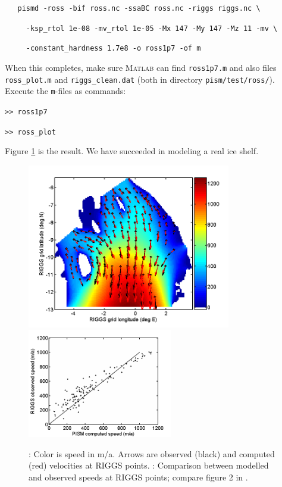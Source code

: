 \documentclass[11pt,final]{amsart}
\newcommand{\Matlab}{\textsc{Matlab}\xspace}
\begin{document}
\verb|   pismd -ross -bif ross.nc -ssaBC ross.nc -riggs riggs.nc \|

\verb|     -ksp_rtol 1e-08 -mv_rtol 1e-05 -Mx 147 -My 147 -Mz 11 -mv \|

\verb|     -constant_hardness 1.7e8 -o ross1p7 -of m|

\noindent When this completes, make sure \Matlab can find \verb|ross1p7.m| and also files \verb|ross_plot.m| and \verb|riggs_clean.dat| (both in directory \verb|pism/test/ross/|).  Execute the \verb|m|-files as commands:

\verb|>> ross1p7|

\verb|>> ross_plot|

\noindent Figure \ref{fig:rossmatlab} is the result.  We have succeeded in modeling a real ice shelf.

\begin{figure}[ht]
\includegraphics[width=3.5in,keepaspectratio=true]{figs/rossquiver}\quad \includegraphics[width=2.5in,keepaspectratio=true]{figs/rossscatter}
\caption{: Color is speed in m/a.  Arrows are observed (black) and computed (red) velocities at RIGGS points.  : Comparison between modelled and observed speeds at RIGGS points; compare figure 2  in \cite{MacAyealetal}.}
\label{fig:rossmatlab}
\end{figure}
\end{document}
